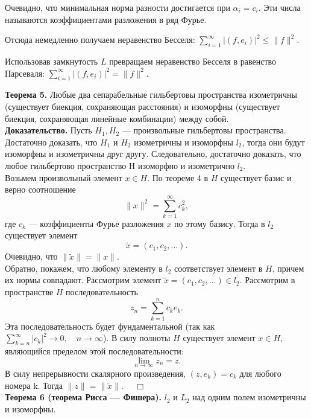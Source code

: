 \documentclass[12pt,a4paper, titlepage]{article}
\begin{document}
Очевидно, что минимальная норма разности достигается при $\alpha_i = c_i$. Эти числа называются коэффициентами разложения в ряд Фурье.

Отсюда немедленно получаем неравенство Бесселя: $\sum\limits_{i=1}^\infty|(f,e_i)|^2 \leqslant \|f\|^2$.

Использовав замкнутость $L$ превращаем неравенство Бесселя в равенство Парсеваля: $\sum\limits_{i=1}^\infty|(f,e_i)|^2 = \|f\|^2$. %

\textbf{Теорема 5.} Любые два сепарабельные гильбертовы пространства изометричны (существует биекция, сохраняющая расстояния) и изоморфны (существует биекция, сохраняющая линейные комбинации) между собой.\\
\textbf{Доказательство.} Пусть $H_1, H_2$ --- произвольные гильбертовы пространства. Достаточно доказать, что $H_1$ и $H_2$ изометричны и изоморфны $l_2$, тогда они будут изоморфны и изометричны друг другу. Следовательно, достаточно доказать, что любое гильбертово пространство H изоморфно и изометрично $l_2$.\\

Возьмем произвольный элемент $x \in H$. По теореме 4 в $H$ существует базис и верно соотношение
$$
\|x\|^2 = \sum_{k=1}^\infty c_k^2,
$$
где $c_k$ --- коэффициенты Фурье разложения $x$ по этому базису. Тогда в $l_2$ существует элемент 
$$
\tilde x = (c_1, c_2, \dots).
$$
Очевидно, что $\|\tilde x\| = \|x\|$.\\

Обратно, покажем, что любому элементу в $l_2$ соответствует элемент в $H$, причем их нормы совпадают. Рассмотрим элемент $\tilde x = (c_1, c_2, \dots) \in l_2$. Рассмотрим в пространстве $H$ последовательность
$$
z_n = \sum_{k=1}^n c_k e_k.
$$
Эта последовательность будет фундаментальной (так как $\sum\limits_{k=n}^{\infty} |c_k|^2 \to 0, \quad n \to \infty $). В силу полноты $H$ существует элемент $x \in H$, являющийся пределом этой последовательности:
$$
\lim_{n \to \infty} z_n = z.
$$
В силу непрерывности скалярного произведения, $(z, e_k) = c_k$ для любого номера k. Тогда $\|z\| = \|\tilde x\|$. $\quad \Box$\\

\textbf{Теорема 6 (теорема Рисса --- Фишера).} $l_2$ и $L_2$ над одним полем изометричны и изоморфны.\\






\end{document}
